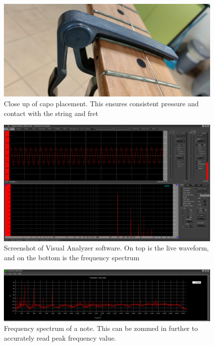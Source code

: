 \documentclass[11pt]{article}
\begin{document}
\begin{flushleft}
            \begin{figure}[!h]
                \includegraphics[angle=270, width = \textwidth]{ee/capo_on_fret.jpg}
                \caption{Close up of capo placement. This ensures consistent pressure and contact with the string and fret} \label{fig6}
            \end{figure}
            \begin{figure}[!h]
                \includegraphics[width = \textwidth]{wave&freq.png}
                \caption{Screenshot of Visual Analyzer software. On top is the live waveform, and on the bottom is the frequency spectrum} \label{fig7}
            \end{figure}
            \begin{figure}[!h]
                \includegraphics[width = \textwidth]{freq.png}
                \caption{Frequency spectrum of a note. This can be zommed in further to accurately read peak frequency value.} \label{fig8}
            \end{figure}

        
    \end{flushleft}
\end{document}
